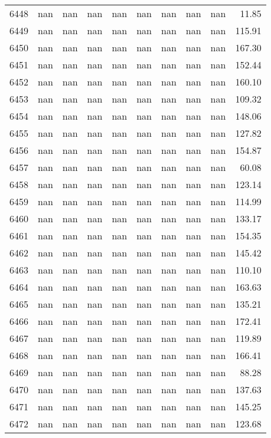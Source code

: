 \begin{tabular}{lrrrrrrrrr}
6448 & nan & nan & nan & nan & nan & nan & nan & nan & 11.85 \\
6449 & nan & nan & nan & nan & nan & nan & nan & nan & 115.91 \\
6450 & nan & nan & nan & nan & nan & nan & nan & nan & 167.30 \\
6451 & nan & nan & nan & nan & nan & nan & nan & nan & 152.44 \\
6452 & nan & nan & nan & nan & nan & nan & nan & nan & 160.10 \\
6453 & nan & nan & nan & nan & nan & nan & nan & nan & 109.32 \\
6454 & nan & nan & nan & nan & nan & nan & nan & nan & 148.06 \\
6455 & nan & nan & nan & nan & nan & nan & nan & nan & 127.82 \\
6456 & nan & nan & nan & nan & nan & nan & nan & nan & 154.87 \\
6457 & nan & nan & nan & nan & nan & nan & nan & nan & 60.08 \\
6458 & nan & nan & nan & nan & nan & nan & nan & nan & 123.14 \\
6459 & nan & nan & nan & nan & nan & nan & nan & nan & 114.99 \\
6460 & nan & nan & nan & nan & nan & nan & nan & nan & 133.17 \\
6461 & nan & nan & nan & nan & nan & nan & nan & nan & 154.35 \\
6462 & nan & nan & nan & nan & nan & nan & nan & nan & 145.42 \\
6463 & nan & nan & nan & nan & nan & nan & nan & nan & 110.10 \\
6464 & nan & nan & nan & nan & nan & nan & nan & nan & 163.63 \\
6465 & nan & nan & nan & nan & nan & nan & nan & nan & 135.21 \\
6466 & nan & nan & nan & nan & nan & nan & nan & nan & 172.41 \\
6467 & nan & nan & nan & nan & nan & nan & nan & nan & 119.89 \\
6468 & nan & nan & nan & nan & nan & nan & nan & nan & 166.41 \\
6469 & nan & nan & nan & nan & nan & nan & nan & nan & 88.28 \\
6470 & nan & nan & nan & nan & nan & nan & nan & nan & 137.63 \\
6471 & nan & nan & nan & nan & nan & nan & nan & nan & 145.25 \\
6472 & nan & nan & nan & nan & nan & nan & nan & nan & 123.68 \\

\end{tabular}
